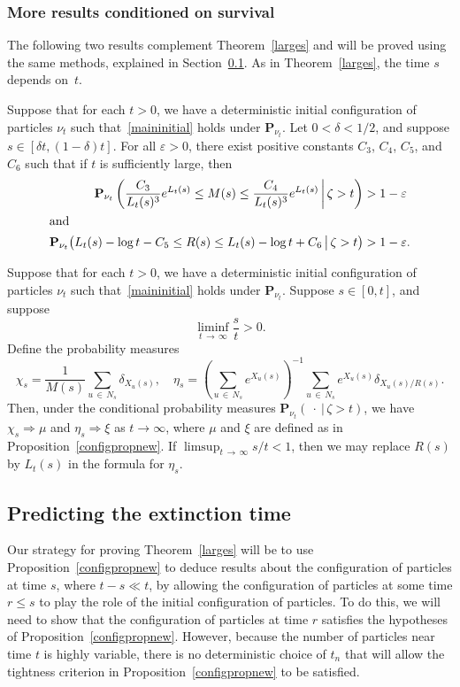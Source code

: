 \documentclass[AHL,Unicode,longabstracts,published]{cedram}
\newcommand*\eps{\varepsilon}
\renewcommand*\P{\mathbf{P}}
\newcommand{\1} {\mathds{1}}
\begin{document}
\subsubsection*{More results conditioned on survival}
The following two results complement Theorem~\ref{larges} and will be proved using the same methods, explained in Section~\ref{sec:predicting}. As in Theorem~\ref{larges}, the time $s$ depends on~$t$.

\begin{theo}\label{meds}
Suppose that for each $t > 0$, we have a deterministic initial configuration of particles $\nu_t$ such that~\eqref{maininitial} holds under $\P_{\nu_t}$. Let $0 < \delta < 1/2$, and suppose $s \in [\delta t, (1 - \delta) t]$. For all $\eps > 0$, there exist positive constants $C_3$, $C_4$, $C_5$, and $C_6$ such that if $t$ is sufficiently large, then
\begin{align*}
\P_{\nu_t} \left(\frac{C_3}{L_t(s)^3} e^{L_t(s)} \leq M(s) \leq \frac{C_4}{L_t(s)^3} e^{L_t(s)} \,\middle|\, \zeta > t \right) &> 1 - \eps
\\
\intertext{and}
\P_{\nu_t}\big(L_t(s) - \log t - C_5 \leq R(s) \leq L_t(s) - \log t + C_6 \,\big|\, \zeta > t\big) &> 1 - \eps.
\end{align*}
\end{theo}

\begin{theo}\label{condconfigprop}
Suppose that for each $t > 0$, we have a deterministic initial configuration of particles $\nu_t$ such that~\eqref{maininitial} holds under $\P_{\nu_t}$.
Suppose $s \in [0, t]$, and suppose
\[
\liminf_{t\,\rightarrow\,\infty} \frac{s}{t} > 0.
\]
Define the probability measures
\[
\chi_s = \frac{1}{M(s)} \sum_{u\,\in\,N_s} \delta_{X_u(s)}, \quad \eta_s = \left(\sum_{u\,\in\,N_s} e^{X_u(s)} \right)^{-1} \sum_{u\,\in\,N_s} e^{X_u(s)} \delta_{X_u(s)/R(s)}.
\]
Then, under the conditional probability measures $\P_{\nu_t}(\:\cdot\:|\,\zeta > t)$, we have $\chi_s \Rightarrow \mu$ and $\eta_s \Rightarrow \xi$ as $t \rightarrow \infty$, where $\mu$ and $\xi$ are defined as in Proposition~\ref{configpropnew}. If $\limsup_{t \,\rightarrow\,\infty} s/t < 1$, then we may replace $R(s)$ by $L_t(s)$ in the formula for $\eta_s$.
\end{theo}

\subsection{Predicting the extinction time}\label{sec:predicting}
Our strategy for proving Theorem~\ref{larges} will be to use Proposition~\ref{configpropnew} to deduce results about the configuration of particles at time $s$, where $t - s \ll t$, by allowing the configuration of particles at some time $r \leq s$ to play the role of the initial configuration of particles. To do this, we will need to show that the configuration of particles at time $r$ satisfies the hypotheses of Proposition~\ref{configpropnew}. However, because the number of particles near time $t$ is highly variable, there is no deterministic choice of $t_n$ that will allow the tightness criterion in Proposition~\ref{configpropnew} to be satisfied.
\end{document}
